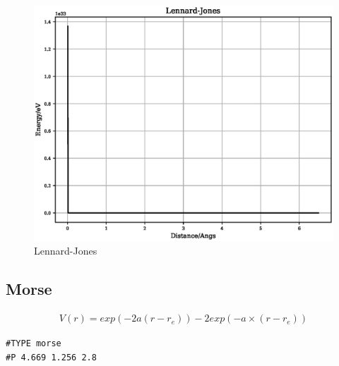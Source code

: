 \FloatBarrier
\begin{figure}[h]
  \begin{center}
    \includegraphics[scale=0.5]{appendix/functions/plots/lennard_jones.eps}
    \caption{Lennard-Jones}
    \label{graph:Lennard-Jones}
  \end{center}
\end{figure}
\FloatBarrier








\subsection{Morse}

\begin{equation}
\begin{split}
V(r) = exp(-2 a (r - r_e)) - 2 exp (-a \times (r - r_e))
\end{split}
\label{eq:eqMorse}
\end{equation}

\begin{lstlisting}[style=pseudocode,caption={Morse}]
#TYPE morse
#P 4.669 1.256 2.8
\end{lstlisting}

